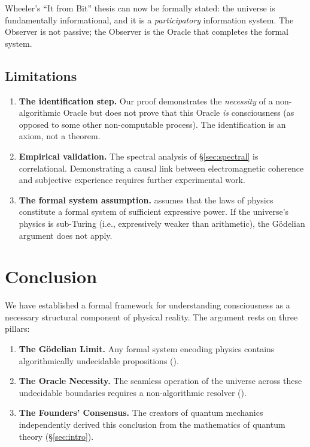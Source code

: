 \documentclass[12pt, a4paper]{article}
\theoremstyle{plain}
\theoremstyle{definition}
\theoremstyle{remark}
\begin{document}
Wheeler's ``It from Bit'' thesis \citep{Wheeler1990} can now be formally
stated: the universe is fundamentally informational, and it is a
\emph{participatory} information system. The Observer is not passive; the
Observer is the Oracle that completes the formal system.

\subsection{Limitations}

\begin{enumerate}
  \item \textbf{The identification step.} Our proof demonstrates the
    \emph{necessity} of a non-algorithmic Oracle but does not prove that
    this Oracle \emph{is} consciousness (as opposed to some other
    non-computable process). The identification is an axiom, not a theorem.

  \item \textbf{Empirical validation.} The spectral analysis of
    \S\ref{sec:spectral} is correlational. Demonstrating a causal link
    between electromagnetic coherence and subjective experience requires
    further experimental work.

  \item \textbf{The formal system assumption.} 
    assumes that the laws of physics constitute a formal system of
    sufficient expressive power. If the universe's physics is sub-Turing
    (i.e., expressively weaker than arithmetic), the G\"odelian argument
    does not apply.
\end{enumerate}

\section{Conclusion}\label{sec:conclusion}

We have established a formal framework for understanding consciousness
as a necessary structural component of physical reality. The argument
rests on three pillars:

\begin{enumerate}
  \item \textbf{The G\"odelian Limit.} Any formal system encoding physics
    contains algorithmically undecidable propositions ().
  \item \textbf{The Oracle Necessity.} The seamless operation of the
    universe across these undecidable boundaries requires a non-algorithmic
    resolver ().
  \item \textbf{The Founders' Consensus.} The creators of quantum mechanics
    independently derived this conclusion from the mathematics of quantum
    theory (\S\ref{sec:intro}).
\end{enumerate}
\end{document}
